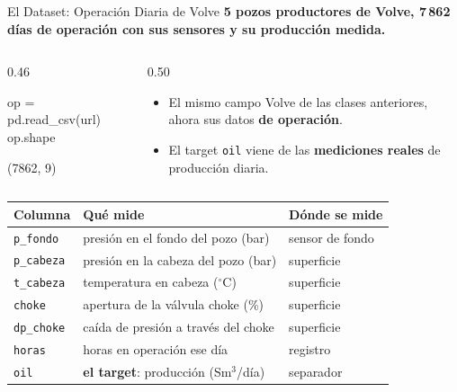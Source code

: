 \documentclass[aspectratio=169, 11pt]{beamer}
\begin{document}
\begin{frame}[fragile,shrink=25]{El Dataset: Operación Diaria de Volve}
  \vspace{-4pt}
  {\small\color{arcaDark}\bfseries
    5 pozos productores de Volve, 7\,862 días de operación con sus sensores y su producción medida.}

  \vspace{4pt}
  \begin{columns}[T]
    \begin{column}{0.46\textwidth}
      \begin{pyblock}
op = pd.read_csv(url)
op.shape
      \end{pyblock}
      \vspace{2pt}
      \begin{outputblock}[]
(7862, 9)
      \end{outputblock}
    \end{column}
    \begin{column}{0.50\textwidth}
      {\scriptsize\color{textMuted}
      \begin{itemize}\setlength{\itemsep}{4pt}
        \item[{\color{arcaRed}\scriptsize\faDatabase}]
          El mismo campo Volve de las clases anteriores,
          ahora sus datos \textbf{de operación}.
        \item[{\color{codeGreen}\scriptsize\faCheck}]
          El target \texttt{oil} viene de las \textbf{mediciones
          reales} de producción diaria.
      \end{itemize}
      }
    \end{column}
  \end{columns}

  \vspace{4pt}
  \centering
  {\scriptsize
  \renewcommand{\arraystretch}{1.3}
  \begin{tabular}{@{}l l l@{}}
    \toprule
    {\bfseries\color{arcaRed} Columna} & {\bfseries\color{arcaDark} Qué mide} & {\bfseries\color{arcaDark} Dónde se mide} \\
    \midrule
    \texttt{p\_fondo} & presión en el fondo del pozo (bar) & sensor de fondo \\
    \texttt{p\_cabeza} & presión en la cabeza del pozo (bar) & superficie \\
    \texttt{t\_cabeza} & temperatura en cabeza (\(^{\circ}\)C) & superficie \\
    \texttt{choke} & apertura de la válvula choke (\%) & superficie \\
    \texttt{dp\_choke} & caída de presión a través del choke & superficie \\
    \texttt{horas} & horas en operación ese día & registro \\
    \midrule
    \texttt{oil} & \textbf{el target}: producción (Sm\(^3\)/día) & separador \\
    \bottomrule
  \end{tabular}
  }
\end{frame}
\end{document}
